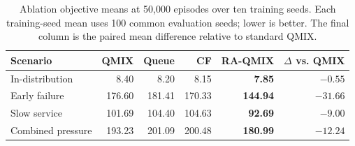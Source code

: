 \documentclass[11pt]{article}
\begin{document}
\begin{table}[!htbp]
\centering
\small
\caption{Ablation objective means at 50,000 episodes over ten training seeds. Each training-seed mean uses 100 common evaluation seeds; lower is better. The final column is the paired mean difference relative to standard QMIX.}
\label{tab:ten-seed-ablation-results}
\begin{tabular}{lrrrrr}
\toprule
Scenario & QMIX & Queue & CF & \textbf{RA-QMIX} & $\Delta$ vs. QMIX \\
\midrule
In-distribution & 8.40 & 8.20 & 8.15 & \textbf{7.85} & \textbf{$-0.55$} \\
Early failure & 176.60 & 181.41 & 170.33 & \textbf{144.94} & \textbf{$-31.66$} \\
Slow service & 101.69 & 104.40 & 104.63 & \textbf{92.69} & \textbf{$-9.00$} \\
Combined pressure & 193.23 & 201.09 & 200.48 & \textbf{180.99} & \textbf{$-12.24$} \\
\bottomrule
\end{tabular}
\end{table}
\end{document}
